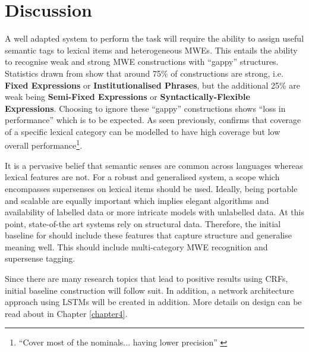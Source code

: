 \section{Discussion}
A well adapted system to perform the \dimsum task will require the ability to assign useful semantic tags to lexical items and heterogeneous MWEs. This entails the ability to recognise weak and strong MWE constructions with ``gappy'' structures. Statistics drawn from \cite{Schneider2014} show that around 75\% of constructions are strong, i.e. {\bf Fixed Expressions} or {\bf Institutionalised Phrases}, but the additional 25\% are weak being {\bf Semi-Fixed Expressions} or {\bf Syntactically-Flexible Expressions}. Choosing to ignore these ``gappy'' constructions shows ``loss in performance''\cite{Schneider2014} which is to be expected. As seen previously, \cite{Ramisch2012} confirms that coverage of a specific lexical category can be modelled to have high coverage but low overall performance\footnote{``Cover most of the nominals... having lower precision'' \cite{Ramisch2012}}. 

It is a pervasive belief that semantic senses are common across languages whereas lexical features are not. For a robust and generalised system, a scope which encompasses supersenses on lexical items should be used. Ideally, being portable and scalable are equally important which implies elegant algorithms and availability of labelled data or more intricate models with unlabelled data. At this point, state-of-the art systems rely on structural data. 
Therefore, the initial baseline for \dimsum should include these features that capture structure and generalise meaning well. This should include multi-category MWE recognition and supersense tagging. 

Since there are many research topics that lead to positive results using CRFs, initial baseline construction will follow suit. In addition, a network architecture approach using LSTMs will be created in addition. More details on design can be read about in Chapter \ref{chapter4}.

